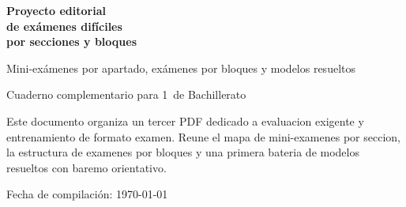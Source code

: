 \begin{titlepage}
\thispagestyle{fancy}
\centering
\vspace*{2.5cm}

{\Huge\bfseries Proyecto editorial\\[0.4em] de ex\'amenes dif\'iciles\\[0.4em] por secciones y bloques\par}
\vspace{1.2cm}

{\Large Mini-ex\'amenes por apartado, ex\'amenes por bloques y modelos resueltos\par}
\vspace{1.6cm}

{\Large Cuaderno complementario para 1\textordmasculine\ de Bachillerato\par}
\vspace{1.3cm}

\begin{tcolorbox}[basebox,width=0.86\textwidth]
Este documento organiza un tercer PDF dedicado a evaluacion exigente y entrenamiento de
formato examen. Reune el mapa de mini-examenes por seccion, la estructura de examenes por
bloques y una primera bateria de modelos resueltos con baremo orientativo.
\end{tcolorbox}

\vfill
{\large Fecha de compilaci\'on: \today\par}
\end{titlepage}
